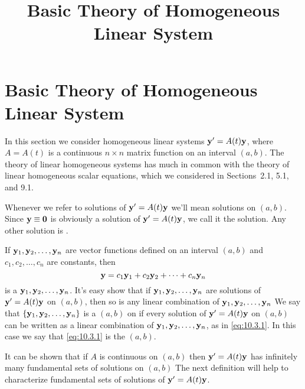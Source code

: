 \documentclass{ximera}
\title{Basic Theory of Homogeneous Linear System}%
\begin{document}
\begin{abstract}

\end{abstract}

\maketitle

\section*{Basic Theory of Homogeneous Linear System}

In this section we consider homogeneous linear systems ${\bf y}'=
A(t){\bf y}$, where $A=A(t)$ is a continuous $n\times n$ matrix
function on an interval $(a,b)$. The theory of linear homogeneous
systems has much in common with the theory of linear homogeneous
scalar equations, which we considered in
Sections~2.1, 5.1, and 9.1.

Whenever we refer to solutions of ${\bf y}'=A(t){\bf y}$ we'll mean
solutions on $(a,b)$. Since ${\bf y}\equiv{\bf 0}$ is obviously a
solution of ${\bf y}'=A(t){\bf y}$, we call it the 
solution. Any other solution is .

If ${\bf y}_1, {\bf y}_2, \dots, {\bf y}_n$ are vector functions
defined on an interval $(a,b)$ and $c_1, c_2, \dots, c_n$ are
constants, then
\begin{equation} \label{eq:10.3.1}
{\bf y}=c_1{\bf y}_1+c_2{\bf y}_2+\cdots+c_n{\bf y}_n
\end{equation}
is a  ${\bf y}_1, {\bf y}_2, \ldots,{\bf
y}_n$. It's easy show that if ${\bf
y}_1, {\bf y}_2, \dots,{\bf y}_n$ are solutions of ${\bf y}'=A(t){\bf
y}$ on $(a,b)$, then so is any linear combination of
 ${\bf y}_1, {\bf y}_2, \dots, {\bf y}_n$ %
 We say that
$\{{\bf y}_1,{\bf y}_2,\dots,{\bf y}_n\}$ is a  $(a,b)$ on if every solution of
${\bf y}'=A(t){\bf y}$ on $(a,b)$ can be written as a linear combination of
${\bf y}_1, {\bf y}_2, \dots, {\bf y}_n$, as in \eqref{eq:10.3.1}.
In this
case we say that \eqref{eq:10.3.1} is the  $(a,b)$.



It can be shown that if $A$ is continuous on $(a,b)$ then ${\bf
y}'=A(t){\bf y}$ has infinitely many fundamental sets of solutions on
$(a,b)$ %
The next
definition will help to characterize fundamental sets of solutions of
${\bf y}'=A(t){\bf y}$.
\end{document}
